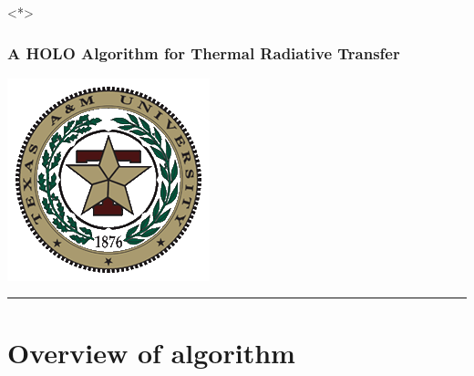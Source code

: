 \documentclass[xcolor=dvipsnames,hyperref={pdfpagelabels=false},unknownkeysallowed]{beamer}
\newcommand{\shorttitle}{\color{black} A HOLO Algorithm for Thermal Radiative Transfer
    \makebox[\linewidth]{\rule{\textwidth}{5pt}}
}
\begin{document}
\begin{frame}<*>
    \frametitle{\shorttitle}
        \vspace{0pt}
        \begin{minipage}[c][0.6\textheight]{0.2\textwidth}
            \hspace{-2em}\includegraphics[width=\textwidth]{tamu_seal.png}\hspace{1em}
            \rule[-0.3\textheight]{1pt}{0.8\textheight}
        \end{minipage}
    \vspace{0pt}
        \begin{minipage}[c][0.6\textheight]{0.74\textwidth}
\tableofcontents[
hideothersubsections,
sectionstyle=show,
subsectionstyle=hide
]
         \end{minipage}
\end{frame}
\section{Overview of algorithm}
\end{document}
